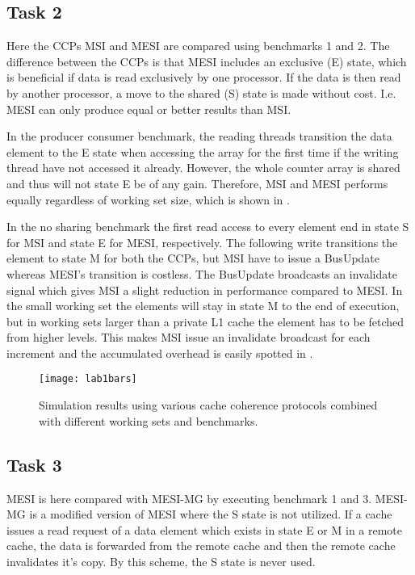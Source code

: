 \subsection{Task 2}
\label{sec:lab12}
Here the CCPs MSI and MESI are compared using benchmarks 1 and 2. The difference between the CCPs is that MESI includes an exclusive (E) state, which is beneficial if data is read exclusively by one processor. If the data is then read by another processor, a move to the shared (S) state is made without cost. I.e. MESI can only produce equal or better results than MSI.

In the producer consumer benchmark, the reading threads transition the data element to the E state when accessing the array for the first time if the writing thread have not accessed it already. However, the whole counter array is shared and thus will not state E be of any gain. Therefore, MSI and MESI performs equally regardless of working set size, which is shown in .

In the no sharing benchmark the first read access to every element end in state S for MSI and state E for MESI, respectively. The following write transitions the element to state M for both the CCPs, but MSI have to issue a BusUpdate whereas MESI's transition is costless. The BusUpdate broadcasts an invalidate signal which gives MSI a slight reduction in performance compared to MESI. In the small working set the elements will stay in state M to the end of execution, but in working sets larger than a private L1 cache the element has to be fetched from higher levels. This makes MSI issue an invalidate broadcast for each increment and the accumulated overhead is easily spotted in . 

\begin{figure}[t]
	\center
	\texttt{[image: lab1bars]}
	\caption{Simulation results using various cache coherence protocols combined with different working sets and benchmarks.}
	\label{fig:lab1bars}
\end{figure}

\subsection{Task 3}
\label{sec:lab13}
MESI is here compared with MESI-MG by executing benchmark 1 and 3. MESI-MG is a modified version of MESI where the S state is not utilized. If a cache issues a read request of a data element which exists in state E or M in a remote cache, the data is forwarded from the remote cache and then the remote cache invalidates it's copy. By this scheme, the S state is never used.

